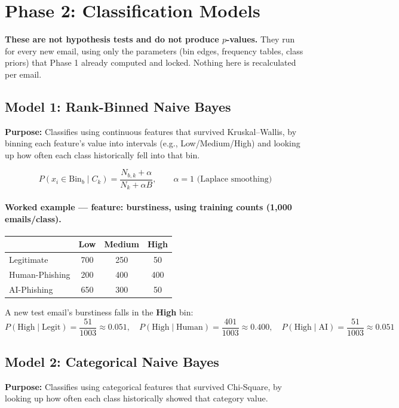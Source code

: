 \documentclass[11pt]{article}
\newcommand{\purpose}[1]{\par\noindent\textbf{Purpose:} #1\par}
\begin{document}
\section{Phase 2: Classification Models}
\textbf{These are not hypothesis tests and do not produce $p$-values.} They run for every new email,
using only the parameters (bin edges, frequency tables, class priors) that Phase 1 already computed and
locked. Nothing here is recalculated per email.

\subsection{Model 1: Rank-Binned Naive Bayes}
\purpose{Classifies using continuous features that survived Kruskal--Wallis, by binning each feature's
value into intervals (e.g., Low/Medium/High) and looking up how often each class historically fell into
that bin.}

\[
P(x_i \in \text{Bin}_b \mid C_k) = \frac{N_{b,k}+\alpha}{N_k+\alpha B}, \qquad \alpha = 1 \text{ (Laplace smoothing)}
\]

\paragraph{Worked example --- feature: burstiness, using training counts (1{,}000 emails/class).}
\begin{center}
\begin{tabular}{lccc}
\toprule
 & Low & Medium & High \\
\midrule
Legitimate & 700 & 250 & 50 \\
Human-Phishing & 200 & 400 & 400 \\
AI-Phishing & 650 & 300 & 50 \\
\bottomrule
\end{tabular}
\end{center}
A new test email's burstiness falls in the \textbf{High} bin:
\[
P(\text{High}\mid\text{Legit})=\frac{51}{1003}\approx0.051,\quad
P(\text{High}\mid\text{Human})=\frac{401}{1003}\approx0.400,\quad
P(\text{High}\mid\text{AI})=\frac{51}{1003}\approx0.051
\]

\subsection{Model 2: Categorical Naive Bayes}
\purpose{Classifies using categorical features that survived Chi-Square, by looking up how often each
class historically showed that category value.}
\end{document}
